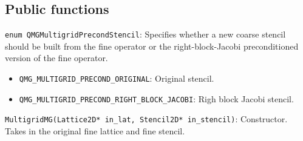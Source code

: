 \documentclass[pdftex,letterpaper,10pt]{article}
\begin{document}
\subsection{Public functions}

{\texttt{enum QMGMultigridPrecondStencil}}: Specifies whether a new coarse stencil should be built from the fine operator or the right-block-Jacobi preconditioned version of the fine operator.
\begin{itemize}
\item {\texttt{QMG\_MULTIGRID\_PRECOND\_ORIGINAL}}: Original stencil.
\item {\texttt{QMG\_MULTIGRID\_PRECOND\_RIGHT\_BLOCK\_JACOBI}}: Righ block Jacobi stencil.
\end{itemize}
{\texttt{MultigridMG(Lattice2D* in\_lat, Stencil2D* in\_stencil)}}: Constructor. Takes in the original fine lattice and fine stencil.
~\\~\\~
\end{document}
